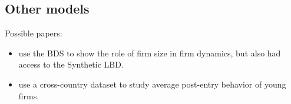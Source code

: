 \documentclass{article}
\begin{document}
\subsection{Other models}

Possible papers:
\begin{itemize}
\item \textcite{10.1257/aer.20141280} use the BDS to show the role of firm size in firm dynamics, but also had access to the Synthetic LBD.
\item \textcite{NBERc0480} use a cross-country dataset to study average post-entry behavior of young firms. 
\end{itemize}

%
%

\printbibliography
\end{document}
